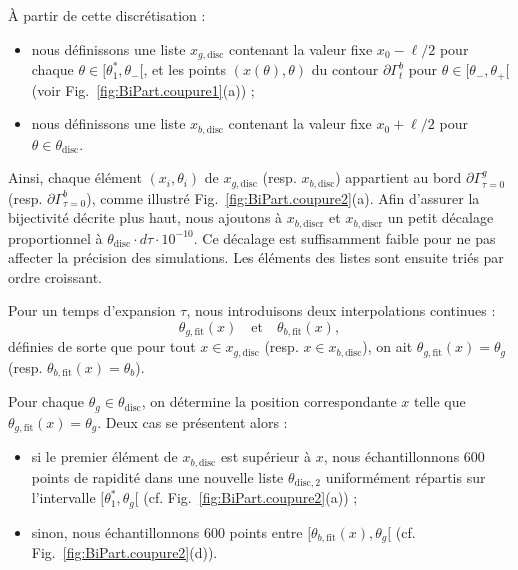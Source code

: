 À partir de cette discrétisation :
\begin{itemize}[label = $\bullet$]
	\item nous définissons une liste \(x_{g,\mathrm{disc}}\) contenant la valeur fixe \(x_0 - \ell/2\) pour chaque \(\theta \in [\theta_1^*,\theta_-[\), et les points \((x(\theta),\theta)\) du contour \(\partial \Gamma_t^b\) pour \(\theta \in [\theta_-,\theta_+[\) (voir Fig.~\ref{fig:BiPart.coupure1}(a)) ;
	\item nous définissons une liste \(x_{b,\mathrm{disc}}\) contenant la valeur fixe \(x_0 + \ell/2\) pour \(\theta \in \theta_{\mathrm{disc}}\).
\end{itemize}

Ainsi, chaque élément \((x_i,\theta_i)\) de \(x_{g,\mathrm{disc}}\) (resp. \(x_{b,\mathrm{disc}}\)) appartient au bord \(\partial \Gamma_{\tau=0}^g\) (resp. \(\partial \Gamma_{\tau=0}^b\)), comme illustré Fig.~\ref{fig:BiPart.coupure2}(a).  
Afin d’assurer la bijectivité décrite plus haut, nous ajoutons à $x_{b,\mathrm{discr}}$ et $x_{b,\mathrm{discr}}$ un petit décalage proportionnel à \(\theta_{\mathrm{disc}} \cdot d\tau \cdot 10^{-10}\). Ce décalage est suffisamment faible pour ne pas affecter la précision des simulations. Les éléments des listes sont ensuite triés par ordre croissant.

\medskip

Pour un temps d’expansion \(\tau\), nous introduisons deux interpolations continues :
\[
\theta_{g,\mathrm{fit}}(x) \quad \text{et} \quad \theta_{b,\mathrm{fit}}(x),
\]
définies de sorte que pour tout \(x \in x_{g,\mathrm{disc}}\) (resp. \(x \in x_{b,\mathrm{disc}}\)), on ait \(\theta_{g,\mathrm{fit}}(x) = \theta_g\) (resp. \(\theta_{b,\mathrm{fit}}(x) = \theta_b\)).  

Pour chaque \(\theta_g \in \theta_{\mathrm{disc}}\), on détermine la position correspondante \(x\) telle que \(\theta_{g,\mathrm{fit}}(x) = \theta_g\).  
Deux cas se présentent alors :
\begin{itemize}[label = $\bullet$]
	\item si le premier élément de \(x_{b,\mathrm{disc}}\) est supérieur à \(x\), nous échantillonnons \(600\) points de rapidité dans une nouvelle liste \(\theta_{\mathrm{disc},2}\) uniformément répartis sur l’intervalle \([\theta_1^*,\theta_g[\) (cf. Fig.~\ref{fig:BiPart.coupure2}(a)) ;
	\item sinon, nous échantillonnons \(600\) points entre \([\theta_{b,\mathrm{fit}}(x),\theta_g[\) (cf. Fig.~\ref{fig:BiPart.coupure2}(d)).
\end{itemize}


